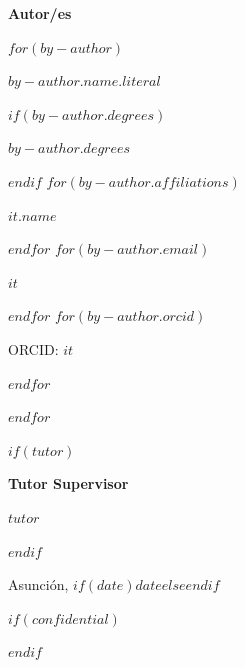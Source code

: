 {{    %
    \begin{center}
      {\fontsize{13}{17}\selectfont\bfseries Autor/es\par}
      \vskip0.4cm
      $for(by-author)$
        \begin{minipage}[t]{0.45\textwidth}
          \centering
          {\fontsize{12}{16}\selectfont\textbf{$by-author.name.literal$}\par}
          $if(by-author.degrees)$
            \vskip0.1cm
            {\fontsize{10}{14}\selectfont $by-author.degrees$\par}
          $endif$
          $for(by-author.affiliations)$
            \vskip0.1cm
            {\fontsize{10}{14}\selectfont $it.name$\par}
          $endfor$
          $for(by-author.email)$
            \vskip0.1cm
            {\fontsize{10}{14}\selectfont\texttt{$it$}\par}
          $endfor$
          $for(by-author.orcid)$
            \vskip0.1cm
            {\fontsize{9}{13}\selectfont
              ORCID: \href{https://orcid.org/$it$}{$it$}\par}
          $endfor$
        \end{minipage}\hfill
      $endfor$
    \end{center}

    $if(tutor)$
      \begin{center}
        \vskip0.9cm
        {\fontsize{13}{17}\selectfont\bfseries Tutor \textbar{} Supervisor\par}
        \vskip0.15cm
        {\fontsize{12}{16}\selectfont $tutor$\par}
      \end{center}
    $endif$


    \begin{center}
      \vskip1.2cm
      {\fontsize{12}{16}\selectfont
        Asunci\'{o}n, $if(date)$$date$$else$\number\the\year$endif$\par}
    \end{center}

    $if(confidential)$
      \vskip0.8cm
      \begin{center}
      \end{center}
    $endif$

    \newpage\mbox{}\thispagestyle{empty}\newpage
  }
}

